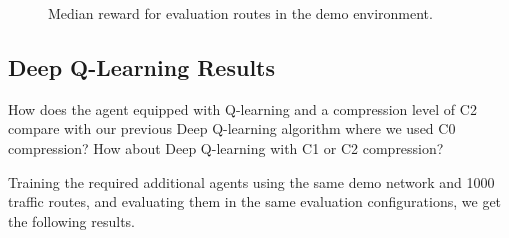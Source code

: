 \documentclass[a4paper]{report}
\begin{document}
\begin{figure}[H]
  \centering
  \caption{Median reward for evaluation routes in the demo environment.}
  \label{fig:compressed_q_learning_demo_eval_2}
\end{figure}

\subsection{Deep Q-Learning Results}

How does the agent equipped with Q-learning and a compression level of C2 compare with our previous Deep Q-learning algorithm where we used C0 compression? How about Deep Q-learning with C1 or C2 compression?

Training the required additional agents using the same demo network and 1000 traffic routes, and evaluating them in the same evaluation configurations, we get the following results.
\end{document}
